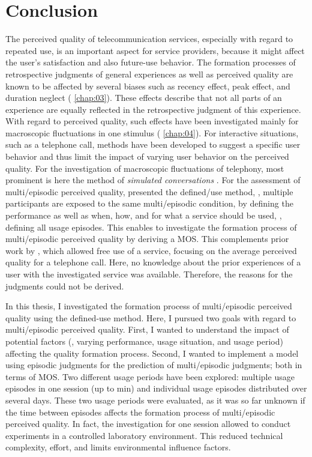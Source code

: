 \chapter{Conclusion}\label{chap:discussion}
The perceived quality of telecommunication services, especially with regard to repeated use, is an important aspect for service providers, because it might affect the user's satisfaction and also future-use behavior.
The formation processes of retrospective judgments of general experiences as well as perceived quality are known to be affected by several biases such as recency effect, peak effect, and duration neglect (\cf{} \autoref{chap:03}).
These effects describe that not all parts of an experience are equally reflected in the retrospective judgment of this experience.
With regard to perceived quality, such effects have been investigated mainly for macroscopic fluctuations in one stimulus (\cf{} \autoref{chap:04}).
For interactive situations, such as a telephone call, methods have been developed to suggest a specific user behavior and thus limit the impact of varying user behavior on the perceived quality.
For the investigation of macroscopic fluctuations of telephony, most prominent is here the method of \emph{simulated conversations} \citep{weiss_modeling_2009}.
For the assessment of multi\-/episodic perceived quality, \citet{moller_single-call_2011} presented the defined\-/use method, \ie, multiple participants are exposed to the same multi\-/episodic condition, by defining the performance as well as when, how, and for what a service should be used, \ie, defining all usage episodes.
This enables to investigate the formation process of multi\-/episodic perceived quality by deriving a \ac{MOS}.
This complements prior work by \citet{duncanson_average_1969}, which allowed free use of a service, focusing on the average perceived quality for a telephone call.
Here, no knowledge about the prior experiences of a user with the investigated service was available.
Therefore, the reasons for the judgments could not be derived.

In this thesis, I investigated the formation process of multi\-/episodic perceived quality using the  defined-use method.
Here, I pursued two goals with regard to multi\-/episodic perceived quality.
First, I wanted to understand the impact of potential factors (\ie, varying performance, usage situation, and usage period) affecting the quality formation process.
Second, I wanted to implement a model using episodic judgments for the prediction of multi\-/episodic judgments; both in terms of \ac{MOS}.
Two different usage periods have been explored: multiple usage episodes in one session (up to \unit[45]{min}) and individual usage episodes distributed over several days.
These two usage periods were evaluated, as it was so far unknown if the time between episodes affects the formation process of multi\-/episodic perceived quality.
In fact, the investigation for one session allowed to conduct experiments in a controlled laboratory environment.
This reduced technical complexity, effort, and limits environmental influence factors.

